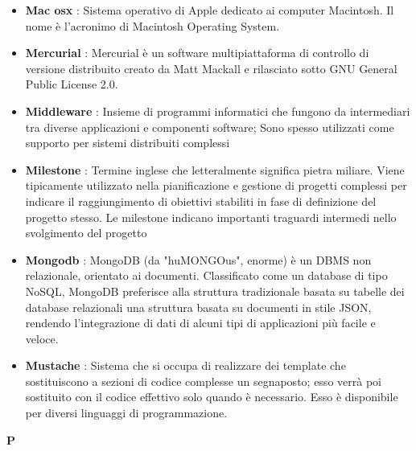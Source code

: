 \begin{flushleft}
\begin{itemize}[label={}]
\item \textbf{Mac osx} : Sistema operativo di Apple dedicato ai computer Macintosh. Il nome è l'acronimo di Macintosh Operating System.
\item \textbf{Mercurial} : Mercurial è un software multipiattaforma di controllo di versione distribuito creato da Matt Mackall e rilasciato sotto GNU General Public License 2.0.
\item \textbf{Middleware} : Insieme di programmi informatici che fungono da intermediari tra diverse applicazioni e componenti software; Sono spesso utilizzati come supporto per sistemi distribuiti complessi
\item \textbf{Milestone} : Termine inglese che letteralmente significa pietra miliare. Viene tipicamente utilizzato nella pianificazione e gestione di progetti complessi per indicare il raggiungimento di obiettivi stabiliti in fase di definizione del progetto stesso. Le milestone indicano importanti traguardi intermedi nello svolgimento del progetto
\item \textbf{Mongodb} : MongoDB (da "huMONGOus", enorme) è un DBMS non relazionale, orientato ai documenti. Classificato come un database di tipo NoSQL, MongoDB preferisce alla struttura tradizionale basata su tabelle dei database relazionali una struttura basata su documenti in stile JSON, rendendo l'integrazione di dati di alcuni tipi di applicazioni più facile e veloce.
\item \textbf{Mustache} : Sistema che si occupa di realizzare dei template che sostituiscono a sezioni di codice complesse un segnaposto; esso verrà poi sostituito con il codice effettivo solo quando è necessario. Esso è disponibile per diversi linguaggi di programmazione.
\end{itemize}
\end{flushleft}
\newpage
{\huge \textbf{P}}
